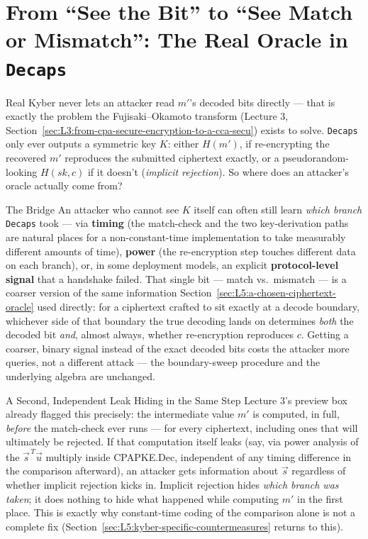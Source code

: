\section{From ``See the Bit'' to ``See Match or Mismatch'': The Real Oracle in \texttt{Decaps}}
\label{sec:L5:from-bit-to-match-mismatch-decaps}

Real Kyber never lets an attacker read $m'$'s decoded bits directly --- that is exactly the problem the Fujisaki--Okamoto transform (Lecture 3, Section~\ref{sec:L3:from-cpa-secure-encryption-to-a-cca-secu}) exists to solve. \texttt{Decaps} only ever outputs a symmetric key $K$: either $H(m')$, if re-encrypting the recovered $m'$ reproduces the submitted ciphertext exactly, or a pseudorandom-looking $H(sk,c)$ if it doesn't (\emph{implicit rejection}). So where does an attacker's oracle actually come from?

\begin{rmkbox}{The Bridge}
An attacker who cannot see $K$ itself can often still learn \emph{which branch} \texttt{Decaps} took --- via \textbf{timing} (the match-check and the two key-derivation paths are natural places for a non-constant-time implementation to take measurably different amounts of time), \textbf{power} (the re-encryption step touches different data on each branch), or, in some deployment models, an explicit \textbf{protocol-level signal} that a handshake failed. That single bit --- match vs.\ mismatch --- is a coarser version of the same information Section~\ref{sec:L5:a-chosen-ciphertext-oracle} used directly: for a ciphertext crafted to sit exactly at a decode boundary, whichever side of that boundary the true decoding lands on determines \emph{both} the decoded bit \emph{and}, almost always, whether re-encryption reproduces $c$. Getting a coarser, binary signal instead of the exact decoded bits costs the attacker more queries, not a different attack --- the boundary-sweep procedure and the underlying algebra are unchanged.
\end{rmkbox}

\begin{previewbox}{A Second, Independent Leak Hiding in the Same Step}
Lecture 3's preview box already flagged this precisely: the intermediate value $m'$ is computed, in full, \emph{before} the match-check ever runs --- for every ciphertext, including ones that will ultimately be rejected. If that computation itself leaks (say, via power analysis of the $\vec s^{\,T}\vec u$ multiply inside CPAPKE.Dec, independent of any timing difference in the comparison afterward), an attacker gets information about $\vec s$ regardless of whether implicit rejection kicks in. Implicit rejection hides \emph{which branch was taken}; it does nothing to hide what happened while computing $m'$ in the first place. This is exactly why constant-time coding of the comparison alone is not a complete fix (Section~\ref{sec:L5:kyber-specific-countermeasures} returns to this).
\end{previewbox}

